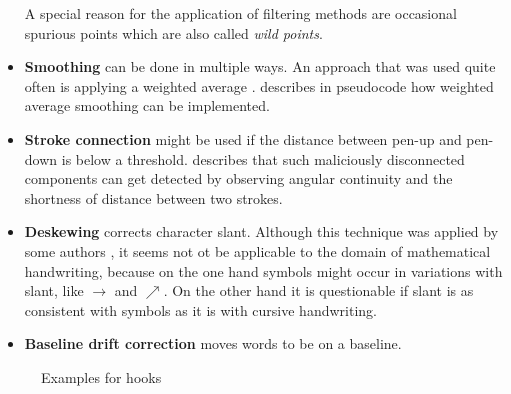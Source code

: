 \begin{itemize}
          A special reason for the application of filtering methods are occasional spurious points which are also called \textit{wild points}.
    \item \textbf{Smoothing} can be done in multiple ways. An approach that was
          used quite often is applying a weighted average
          \cite{Groner66,Division87,Arakaw83}. 
          describes in pseudocode how weighted average smoothing can be implemented.
    \item \textbf{Stroke connection} might be used if the distance between
          pen-up and pen-down is below a threshold. \cite{Guerfali93} describes
          that such maliciously disconnected components can get detected by
          observing angular continuity and the shortness of distance between
          two strokes.
    \item \textbf{Deskewing} corrects character slant. Although this technique
          was applied by some authors \cite{Bozinovic1989,Guerfali93,IWFHR94},
          it seems not ot be
          applicable to the domain of mathematical handwriting, because on the
          one hand symbols might occur in variations with slant, like
          $\rightarrow$ and $\nearrow$. On the other hand it is questionable
          if slant is as consistent with symbols as it is with cursive
          handwriting.
    \item \textbf{Baseline drift correction} moves words to be on a baseline.
\end{itemize}

\begin{figure}[ht]
    \centering
    \caption{Examples for hooks}
    \label{fig:hooks}
\end{figure}

